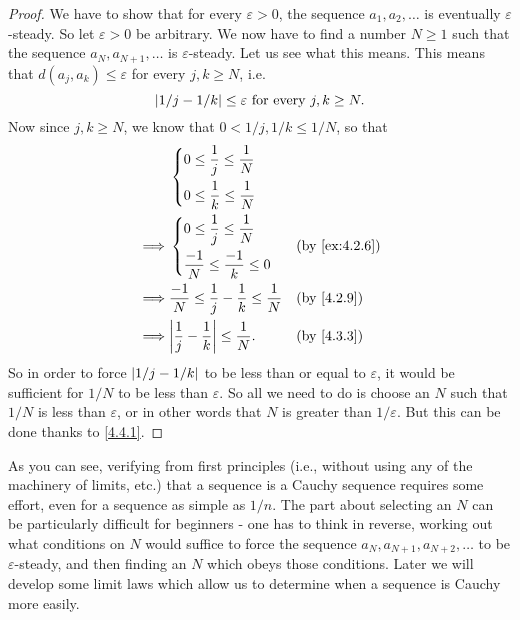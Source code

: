 \begin{proof}
  We have to show that for every \(\varepsilon > 0\), the sequence \(a_1, a_2, \dots\) is eventually \(\varepsilon\)-steady.
  So let \(\varepsilon > 0\) be arbitrary.
  We now have to find a number \(N \geq 1\) such that the sequence \(a_N, a_{N + 1}, \dots\) is \(\varepsilon\)-steady.
  Let us see what this means.
  This means that \(d(a_j, a_k) \leq \varepsilon\) for every \(j, k \geq N\), i.e.
  \[
    \left\lvert1 / j - 1 / k\right\rvert \leq \varepsilon \text{ for every } j, k \geq N.
  \]
  Now since \(j, k \geq N\), we know that \(0 < 1 / j, 1 / k \leq 1 / N\), so that
  \begin{align*}
             &
    \begin{dcases}
      0 \leq \dfrac{1}{j} \leq \dfrac{1}{N} \\
      0 \leq \dfrac{1}{k} \leq \dfrac{1}{N} \\
    \end{dcases}
    \\
    \implies &
    \begin{dcases}
      0 \leq \dfrac{1}{j} \leq \dfrac{1}{N}   \\
      \dfrac{-1}{N} \leq \dfrac{-1}{k} \leq 0 \\
    \end{dcases}
             &                                                                  & \by{ex:4.2.6}              \\
    \implies & \dfrac{-1}{N} \leq \dfrac{1}{j} - \dfrac{1}{k} \leq \dfrac{1}{N} &               & \by{4.2.9} \\
    \implies & \abs{\dfrac{1}{j} - \dfrac{1}{k}} \leq \dfrac{1}{N}.             &               & \by{4.3.3}
  \end{align*}
  So in order to force \(\left\lvert1 / j - 1 / k\right\rvert\) to be less than or equal to \(\varepsilon\), it would be sufficient for \(1 / N\) to be less than \(\varepsilon\).
  So all we need to do is choose an \(N\) such that \(1 / N\) is less than \(\varepsilon\), or in other words that \(N\) is greater than \(1 / \varepsilon\).
  But this can be done thanks to \cref{4.4.1}.
\end{proof}

\begin{note}
  As you can see, verifying from first principles (i.e., without using any of the machinery of limits, etc.) that a sequence is a Cauchy sequence requires some effort, even for a sequence as simple as \(1 / n\).
  The part about selecting an \(N\) can be particularly difficult for beginners
  - one has to think in reverse, working out what conditions on \(N\) would suffice to force the sequence \(a_N, a_{N + 1}, a_{N + 2}, \dots\) to be \(\varepsilon\)-steady, and then finding an \(N\) which obeys those conditions.
  Later we will develop some limit laws which allow us to determine when a sequence is Cauchy more easily.
\end{note}

